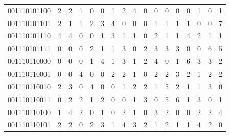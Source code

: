 \documentclass[10pt,a4paper]{article}
\begin{document}
\begin{longtable}{ |c|c|c|c|c|c|c|c|c|c|c|c|c|c|c|c|c| }
    001110101100              & 2                            & 2                                & 1                            & 0                              & 0   & 1   & 2   & 4   & 0   & 0   & 0   & 0   & 0   & 1   & 0   & 1   \\
    001110101101              & 2                            & 1                                & 1                            & 2                              & 3   & 4   & 0   & 0   & 0   & 1   & 1   & 1   & 1   & 0   & 0   & 7   \\
    001110101110              & 4                            & 4                                & 0                            & 0                              & 1   & 3   & 1   & 1   & 0   & 2   & 1   & 1   & 4   & 2   & 1   & 1   \\
    001110101111              & 0                            & 0                                & 0                            & 2                              & 1   & 1   & 3   & 0   & 2   & 3   & 3   & 3   & 0   & 0   & 6   & 5   \\
    001110110000              & 0                            & 0                                & 0                            & 1                              & 4   & 1   & 3   & 1   & 2   & 4   & 0   & 1   & 6   & 3   & 3   & 2   \\
    001110110001              & 0                            & 0                                & 4                            & 0                              & 0   & 2   & 2   & 1   & 0   & 2   & 2   & 3   & 2   & 1   & 2   & 2   \\
    001110110010              & 2                            & 3                                & 0                            & 4                              & 0   & 0   & 1   & 2   & 2   & 1   & 5   & 2   & 1   & 1   & 3   & 0   \\
    001110110011              & 0                            & 2                                & 2                            & 1                              & 2   & 0   & 0   & 1   & 3   & 0   & 5   & 6   & 1   & 3   & 0   & 1   \\
    001110110100              & 1                            & 4                                & 2                            & 0                              & 1   & 0   & 2   & 1   & 0   & 3   & 2   & 0   & 0   & 2   & 2   & 4   \\
    001110110101              & 2                            & 2                                & 0                            & 2                              & 3   & 1   & 4   & 3   & 2   & 1   & 2   & 1   & 1   & 4   & 2   & 0   \\

\end{longtable}
\end{document}
